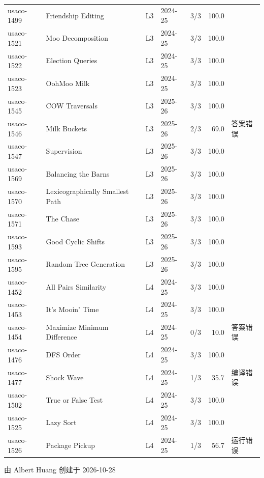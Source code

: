 \documentclass[11pt,a4paper,fontset=none]{ctexart}
\begin{document}
{\begin{longtable}{@{}l>{\raggedright\arraybackslash}p{3.4cm}llrr>{\raggedright\arraybackslash}p{3.1cm}@{}}
usaco-1499 & Friendship Editing & L3 & 2024-25 & 3/3 & 100.0 &  \\
usaco-1521 & Moo Decomposition & L3 & 2024-25 & 3/3 & 100.0 &  \\
usaco-1522 & Election Queries & L3 & 2024-25 & 3/3 & 100.0 &  \\
usaco-1523 & OohMoo Milk & L3 & 2024-25 & 3/3 & 100.0 &  \\
usaco-1545 & COW Traversals & L3 & 2025-26 & 3/3 & 100.0 &  \\
usaco-1546 & Milk Buckets & L3 & 2025-26 & 2/3 & 69.0 & 答案错误 \\
usaco-1547 & Supervision & L3 & 2025-26 & 3/3 & 100.0 &  \\
usaco-1569 & Balancing the Barns & L3 & 2025-26 & 3/3 & 100.0 &  \\
usaco-1570 & Lexicographically Smallest Path & L3 & 2025-26 & 3/3 & 100.0 &  \\
usaco-1571 & The Chase & L3 & 2025-26 & 3/3 & 100.0 &  \\
usaco-1593 & Good Cyclic Shifts & L3 & 2025-26 & 3/3 & 100.0 &  \\
usaco-1595 & Random Tree Generation & L3 & 2025-26 & 3/3 & 100.0 &  \\
usaco-1452 & All Pairs Similarity & L4 & 2024-25 & 3/3 & 100.0 &  \\
usaco-1453 & It's Mooin' Time & L4 & 2024-25 & 3/3 & 100.0 &  \\
usaco-1454 & Maximize Minimum Difference & L4 & 2024-25 & 0/3 & 10.0 & 答案错误 \\
usaco-1476 & DFS Order & L4 & 2024-25 & 3/3 & 100.0 &  \\
usaco-1477 & Shock Wave & L4 & 2024-25 & 1/3 & 35.7 & 编译错误 \\
usaco-1502 & True or False Test & L4 & 2024-25 & 3/3 & 100.0 &  \\
usaco-1525 & Lazy Sort & L4 & 2024-25 & 3/3 & 100.0 &  \\
usaco-1526 & Package Pickup & L4 & 2024-25 & 1/3 & 56.7 & 运行错误 \\
\bottomrule
\end{longtable}}
\par\vspace{2em}\begin{flushright}由 Albert Huang 创建于 2026-10-28\end{flushright}
\end{document}
